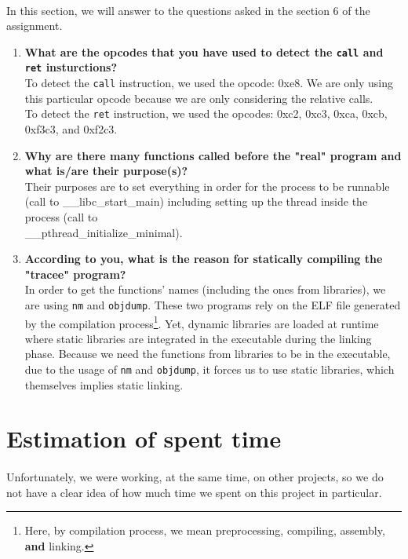 \documentclass[a4paper, 11pt, oneside]{article}
\begin{document}
\paragraph{}In this section, we will answer to the questions asked in the section 6 of the assignment.
\begin{enumerate}
	\item \textbf{What are the opcodes that you have used to detect the \texttt{call} and \texttt{ret} insturctions?}\\
	To detect the \texttt{call} instruction, we used the opcode: 0xe8. We are only using this particular opcode because we are only considering the relative calls.\\
	To detect the \texttt{ret} instruction, we used the opcodes: 0xc2, 0xc3, 0xca, 0xcb, 0xf3c3, and 0xf2c3.
	\item \textbf{Why are there many functions called before the "real" program and what is/are their purpose(s)?}\\
	Their purposes are to set everything in order for the process to be runnable (call to \_\_libc\_start\_main) including setting up the thread inside the process (call to\\\_\_pthread\_initialize\_minimal).
	\item \textbf{According to you, what is the reason for statically compiling the "tracee" program?}\\
	In order to get the functions' names (including the ones from libraries), we are using \texttt{nm} and \texttt{objdump}. These two programs rely on the ELF file generated by the compilation process\footnote{Here, by compilation process, we mean preprocessing, compiling, assembly, \textbf{and} linking.}. Yet, dynamic libraries are loaded at runtime where static libraries are integrated in the executable during the linking phase. Because we need the functions from libraries to be in the executable, due to the usage of \texttt{nm} and \texttt{objdump}, it forces us to use static libraries, which themselves implies static linking.
\end{enumerate}

\section{Estimation of spent time}
\paragraph{}Unfortunately, we were working, at the same time, on other projects, so we do not have a clear idea of how much time we spent on this project in particular.
\end{document}
